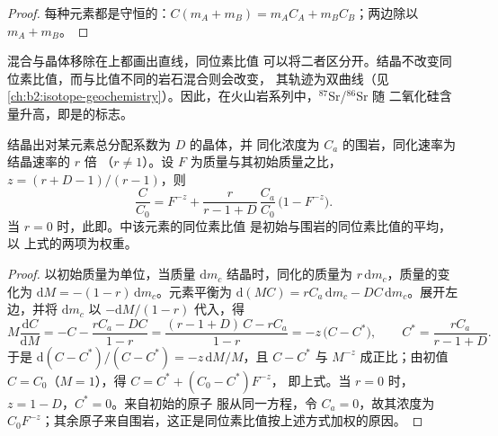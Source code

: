 \begin{proof}
每种元素都是守恒的：$C(m_A + m_B) = m_AC_A + m_BC_B$；两边除以 $m_A + m_B$。
\end{proof}

混合与晶体移除在上都画出直线，同位素比值
可以将二者区分开。结晶不改变同位素比值，而与比值不同的岩石混合则会改变，
其轨迹为双曲线（见
\cref{ch:b2:isotope-geochemistry}）。因此，在火山岩系列中，$^{87}$Sr/$^{86}$Sr 随
二氧化硅含量升高，即是的标志。

\begin{proposition}[同化与分离结晶]
\label{prop:b2:magmatic-differentiation:afc}
结晶出对某元素总分配系数为 $D$ 的晶体，并
同化浓度为 $C_a$ 的围岩，同化速率为结晶速率的 $r$ 倍
（$r \ne 1$）。设 $F$ 为质量与其初始质量之比，
$z = (r + D - 1)/(r - 1)$，则
\[
\frac{C}{C_0} = F^{-z} + \frac{r}{r - 1 + D}\,\frac{C_a}{C_0}\,\bigl(1 - F^{-z}\bigr).
\]
当 $r = 0$ 时，此即。中该元素的同位素比值
是初始与围岩的同位素比值的平均，以
上式的两项为权重。
\end{proposition}

\begin{proof}
以初始质量为单位，当质量 $\mathrm dm_c$ 结晶时，同化的质量为
$r\,\mathrm dm_c$，质量的变化为 $\mathrm dM =
-(1-r)\,\mathrm dm_c$。元素平衡为 $\mathrm d(MC) = rC_a\,\mathrm dm_c -
DC\,\mathrm dm_c$。展开左边，并将 $\mathrm dm_c$ 以
$-\mathrm dM/(1-r)$ 代入，得
\[
M\frac{\mathrm dC}{\mathrm dM} = -C - \frac{rC_a - DC}{1-r}
= \frac{(r - 1 + D)\,C - rC_a}{1 - r} = -z\,\bigl(C - C^*\bigr),
\qquad C^* = \frac{rC_a}{r - 1 + D}.
\]
于是 $\mathrm d(C - C^*)/(C - C^*) = -z\,\mathrm dM/M$，且 $C - C^*$ 与
$M^{-z}$ 成正比；由初值 $C = C_0$（$M = 1$），得 $C = C^* + (C_0 - C^*)F^{-z}$，
即上式。当 $r = 0$ 时，$z = 1 - D$，$C^* = 0$。来自初始的原子
服从同一方程，令 $C_a = 0$，故其浓度为
$C_0F^{-z}$；其余原子来自围岩，这正是同位素比值按上述方式加权的原因。
\end{proof}

